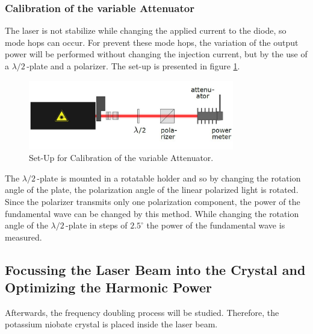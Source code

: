\documentclass[10pt, a4paper, notitlepage, DIV=15]{scrartcl}
\begin{document}
\subsubsection{Calibration of the variable Attenuator}
The laser is not stabilize while changing the applied current to the diode, so mode hops can occur. For prevent these mode hops, the variation of the output power will be performed without changing the injection current, but by the use of a $\lambda/2\,$-plate and a polarizer. The set-up is presented in figure \ref{fig:cal_atten}.
\begin{figure}[h]
	\centering
	\includegraphics[width=0.8\textwidth]{cal_atten}
	\caption{Set-Up for Calibration of the variable Attenuator. \cite{description}}
	\label{fig:cal_atten}
\end{figure}
\newline
The $\lambda/2\,$-plate is mounted in a rotatable holder and so by changing the rotation angle of the plate, the polarization angle of the linear polarized light is rotated. Since the polarizer transmits only one polarization component, the power of the fundamental wave can be changed by this method. \newline
While changing the rotation angle of the $\lambda/2\,$-plate in steps of $2.5^\circ$ the power of the fundamental wave is measured.
\subsection{Focussing the Laser Beam into the Crystal and Optimizing the Harmonic Power}
Afterwards, the frequency doubling process will be studied. Therefore, the potassium niobate crystal is placed inside the laser beam.
\end{document}
